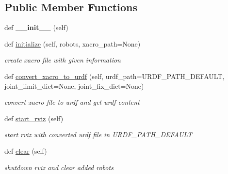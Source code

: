 \subsection*{Public Member Functions}
\begin{DoxyCompactItemize}
\item 
\mbox{\label{classrnb-planning_1_1src_1_1pkg_1_1geometry_1_1builder_1_1xacro__customizer_1_1_xacro_customizer_af15aa722d2365a0f28b8c7a5f6637712}} 
def {\bfseries \+\_\+\+\_\+init\+\_\+\+\_\+} (self)
\item 
def \hyperlink{classrnb-planning_1_1src_1_1pkg_1_1geometry_1_1builder_1_1xacro__customizer_1_1_xacro_customizer_adb27e60fd73eb802058e119d8d28f5a5}{initialize} (self, robots, xacro\+\_\+path=None)
\begin{DoxyCompactList}\small\item\em create xacro file with given information \end{DoxyCompactList}\item 
def \hyperlink{classrnb-planning_1_1src_1_1pkg_1_1geometry_1_1builder_1_1xacro__customizer_1_1_xacro_customizer_a0ab42dfc21dea35c973077b1f12bfb0e}{convert\+\_\+xacro\+\_\+to\+\_\+urdf} (self, urdf\+\_\+path=U\+R\+D\+F\+\_\+\+P\+A\+T\+H\+\_\+\+D\+E\+F\+A\+U\+LT, joint\+\_\+limit\+\_\+dict=None, joint\+\_\+fix\+\_\+dict=None)
\begin{DoxyCompactList}\small\item\em convert xacro file to urdf and get urdf content \end{DoxyCompactList}\item 
\mbox{\label{classrnb-planning_1_1src_1_1pkg_1_1geometry_1_1builder_1_1xacro__customizer_1_1_xacro_customizer_afaab3b1a696c775a8e594c2956097dc2}} 
def \hyperlink{classrnb-planning_1_1src_1_1pkg_1_1geometry_1_1builder_1_1xacro__customizer_1_1_xacro_customizer_afaab3b1a696c775a8e594c2956097dc2}{start\+\_\+rviz} (self)
\begin{DoxyCompactList}\small\item\em start rviz with converted urdf file in U\+R\+D\+F\+\_\+\+P\+A\+T\+H\+\_\+\+D\+E\+F\+A\+U\+LT \end{DoxyCompactList}\item 
\mbox{\label{classrnb-planning_1_1src_1_1pkg_1_1geometry_1_1builder_1_1xacro__customizer_1_1_xacro_customizer_a96873d5b5ba57b4d0ce79cab99b1d3f7}} 
def \hyperlink{classrnb-planning_1_1src_1_1pkg_1_1geometry_1_1builder_1_1xacro__customizer_1_1_xacro_customizer_a96873d5b5ba57b4d0ce79cab99b1d3f7}{clear} (self)
\begin{DoxyCompactList}\small\item\em shutdown rviz and clear added robots \end{DoxyCompactList}\end{DoxyCompactItemize}
